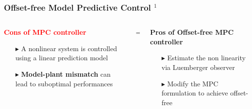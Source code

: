 \documentclass[9pt, aspectratio=169]{beamer}
\begin{document}
\begin{frame}
\frametitle{Offset-free Model Predictive Control $^1$}
\begin{columns}
\begin{column}{0.55\textwidth}
\begin{block}{}
\centering
\textcolor{red}{\textbf{Cons of MPC controller}} 
\begin{itemize}
\footnotesize
	\item[$\blacktriangleright$]  A nonlinear system is controlled using a linear prediction model
	\item[$\blacktriangleright$] \textbf{Model-plant mismatch} can lead to suboptimal performances
\end{itemize}
\end{block}
\end{column}
\hspace{-0.2cm}
\begin{column}{0.02\textwidth}
\centering
\vspace{0.1cm}
$\Rightarrow$
\end{column}
\hspace{-0.2cm}
\begin{column}{0.46\textwidth}
\begin{block}{}
\centering
\textcolor{mygreen}{\textbf{Pros of Offset-free MPC controller}} 
\begin{itemize}
\footnotesize
	\item[$\blacktriangleright$] Estimate the non linearity via Luemberger observer
	\item[$\blacktriangleright$] Modify the MPC formulation to achieve offset-free
\end{itemize}
\end{block}
\end{column}
\end{columns}


\end{frame}
\end{document}
